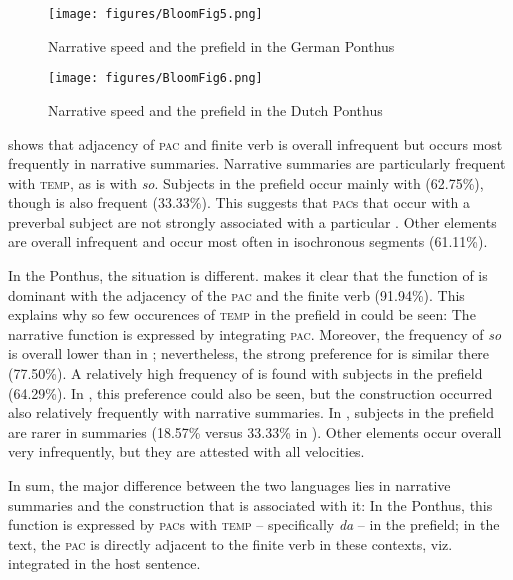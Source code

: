 \documentclass[output=paper,colorlinks,citecolor=brown]{langscibook}
\begin{document}
\begin{figure}
\caption{Narrative speed and the prefield in the German Ponthus}\label{fig:GE4}
	\texttt{[image: figures/BloomFig5.png]}
\end{figure}

\begin{figure}
\caption{Narrative speed and the prefield in the Dutch Ponthus}\label{fig:NL4}
 	\texttt{[image: figures/BloomFig6.png]}

\end{figure}

 shows that adjacency of \textsc{pac} and finite verb is overall infrequent but occurs most frequently in narrative summaries. Narrative summaries are particularly frequent with \textsc{temp}, as  is with \textit{so}. Subjects in the prefield occur mainly with  (62.75\%), though  is also frequent (33.33\%). This suggests that \textsc{pac}s that occur with a preverbal subject are not strongly associated with a particular . Other elements are overall infrequent and occur most often in isochronous segments (61.11\%).

In the  Ponthus, the situation is different.  makes it clear that the function of  is dominant with the adjacency of the \textsc{pac} and the finite verb (91.94\%). This explains why so few occurences of \textsc{temp} in the prefield in  could be seen: The narrative function is expressed by integrating \textsc{pac}. Moreover, the frequency of \textit{so} is overall lower than in ; nevertheless, the strong preference for  is similar there (77.50\%). A relatively high frequency of  is found with subjects in the prefield (64.29\%). In , this preference could also be seen, but the construction occurred also relatively frequently with narrative summaries. In , subjects in the prefield are rarer in summaries (18.57\% versus 33.33\% in ). Other elements occur overall very infrequently, but they are attested with all velocities.

In sum, the major difference between the two languages lies in narrative summaries and the construction that is associated with it: In the  Ponthus, this function is expressed by \textsc{pac}s with \textsc{temp} -- specifically \textit{da} -- in the prefield; in the  text, the \textsc{pac} is directly adjacent to the finite verb in these contexts, viz. integrated in the host sentence.
\end{document}
